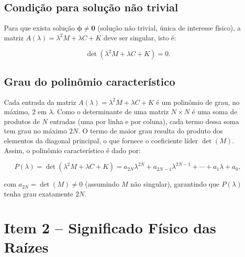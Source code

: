 \documentclass[12pt,a4paper]{article}
\begin{document}
\subsection{Condição para solução não trivial}


Para que exista solução $\boldsymbol{\phi} \neq \mathbf{0}$ (solução não trivial,
única de interesse físico), a matriz $A(\lambda) = \lambda^2 M + \lambda C + K$
deve ser singular, isto é:

\begin{equation}
    \det\left(\lambda^2 M + \lambda C + K\right) = 0.
    \label{eq:det_zero}
\end{equation}

\subsection{Grau do polinômio característico}


Cada entrada da matriz $A(\lambda) = \lambda^2 M + \lambda C + K$ é um polinômio
de grau, no máximo, $2$ em $\lambda$. Como o determinante de uma matriz
$N \times N$ é uma soma de produtos de $N$ entradas (uma por linha e por coluna),
cada termo dessa soma tem grau no máximo $2N$. O termo de maior grau resulta do
produto dos elementos da diagonal principal, o que fornece o coeficiente
líder $\det(M)$. Assim, o polinômio característico é dado por:

\begin{equation}
    P(\lambda) = \det\left(\lambda^2 M + \lambda C + K\right)
    = a_{2N}\lambda^{2N} + a_{2N-1}\lambda^{2N-1} + \cdots + a_1\lambda + a_0,
    \label{eq:poli_geral}
\end{equation}

\noindent com $a_{2N} = \det(M) \neq 0$ (assumindo $M$ não singular), garantindo
que $P(\lambda)$ tenha grau exatamente $2N$.

\section{Item 2 -- Significado Físico das Raízes}
\end{document}
